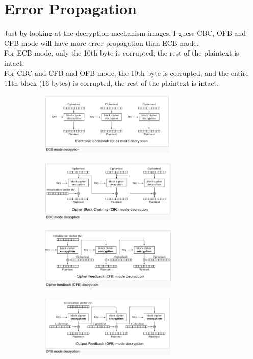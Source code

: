 \documentclass{article}
\begin{document}
\section{Error Propagation}
Just by looking at the decryption mechanism images, I guess CBC, OFB and CFB mode will have more error propagation than ECB mode.\\
For ECB mode, only the 10th byte is corrupted, the rest of the plaintext is intact.\\
For CBC and CFB and OFB mode, the 10th byte is corrupted, and the entire 11th block (16 bytes) is corrupted, the rest of the plaintext is intact.
\begin{figure}[h]
    \centering
    \begin{subfigure}{0.45\textwidth}
        \centering
        \includegraphics[height=3cm]{images/ecb_dec.png}
    \end{subfigure}
    \begin{subfigure}{0.45\textwidth}
        \centering
        \includegraphics[height=3cm]{images/cbc_dec.png}
    \end{subfigure}
    \begin{subfigure}{0.45\textwidth}
        \centering
        \includegraphics[height=3cm]{images/cfb_dec.png}
    \end{subfigure}
    \begin{subfigure}{0.45\textwidth}
        \centering
        \includegraphics[height=3cm]{images/ofb_dec.png}
    \end{subfigure}
\end{figure}\\
\end{document}
